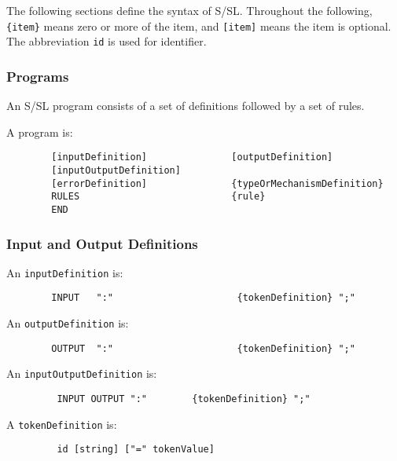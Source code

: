 The      following  sections  define  the  syntax  of  S/SL.
Throughout the following, {\tt \{item\}} means zero or more  of the
item,  and {\tt [item]} means the item is optional.  The abbreviation 
{\tt id} is used for identifier.


\subsubsection{Programs}

An S/SL program consists of a set of definitions followed
by a set of rules.

A program is:
\begin{tscreen}
\begin{verbatim}
        [inputDefinition]               [outputDefinition]
        [inputOutputDefinition]
        [errorDefinition]               {typeOrMechanismDefinition}
        RULES                           {rule}             
        END
\end{verbatim}
\end{tscreen}





\subsubsection{Input and Output Definitions}

An {\tt inputDefinition} is:
\begin{tscreen}
\begin{verbatim}
        INPUT   ":"                      {tokenDefinition} ";"
\end{verbatim}
\end{tscreen}


An {\tt outputDefinition} is:
\begin{tscreen}
\begin{verbatim}
        OUTPUT  ":"                      {tokenDefinition} ";"
\end{verbatim}
\end{tscreen}


An {\tt inputOutputDefinition} is:
\begin{tscreen}
\begin{verbatim}
         INPUT OUTPUT ":"        {tokenDefinition} ";"
\end{verbatim}
\end{tscreen}


A {\tt tokenDefinition} is:
\begin{tscreen}
\begin{verbatim}
         id [string] ["=" tokenValue]
\end{verbatim}
\end{tscreen}


